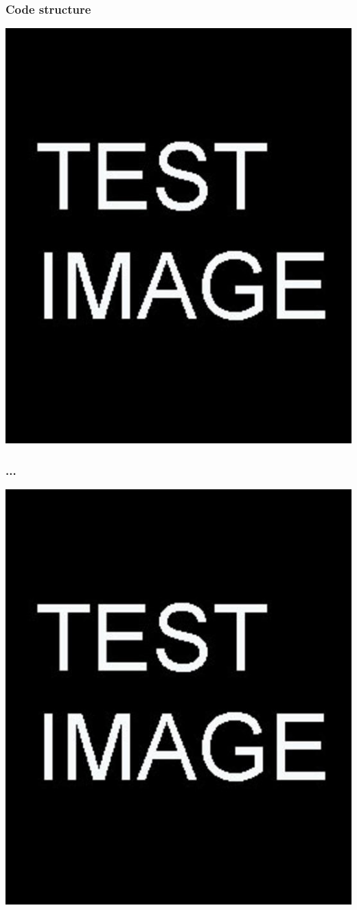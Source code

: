 \documentclass{beamer}
\begin{document}
\begin{frame} %
	\frametitle{Code structure}
	\includegraphics[scale=0.2]{etc/test.jpg}
\end{frame}


\begin{frame} %
	\frametitle{...}
	\includegraphics[scale=0.2]{etc/test.jpg}
\end{frame}
\end{document}
